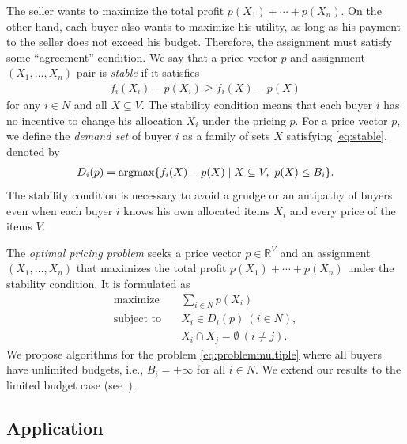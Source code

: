 \documentclass[letterpaper]{article}
\newcommand{\argmax}{\operatornamewithlimits{argmax}}
\theoremstyle{definition}
\newcommand{\COMM}[2]{{
\begin{CJK}{UTF8}{ipxm}
\ifthenelse{\equal{#1}{TM}}{\color{blue}}{
\ifthenelse{\equal{#1}{YK}}{\color{red}}{
\ifthenelse{\equal{#1}{HS}}{\color{cyan}}{
\ifthenelse{\equal{#1}{KK}}{\color{magenta}}}}}
[#1: #2]
\end{CJK}
}}
\begin{document}
The seller wants to maximize the total profit $p(X_1) + \cdots + p(X_n)$.
On the other hand, each buyer also wants to maximize his utility, as long as his payment to the seller does not exceed his budget.
Therefore, the assignment must satisfy some ``agreement'' condition.
We say that a price vector $p$ and assignment $(X_1, \ldots, X_n)$ pair is \emph{stable}
if it satisfies
\begin{align}
  \label{eq:stable}
  f_i(X_i) - p(X_i) \ge f_i(X) - p(X)
\end{align}
for any $i \in N$ and all $X \subseteq V$.
The stability condition means that each buyer $i$ has no incentive to change his allocation $X_i$ under the pricing $p$.
For a price vector $p$, we define the \emph{demand set} of buyer $i$ as a family of sets $X$ satisfying \eqref{eq:stable}, denoted by 
\begin{align}\label{eq:demandset}
  D_i(p) = \argmax \{ f_i(X) - p(X) \mid X \subseteq V, \ p(X) \leq B_i \}.
\end{align}
The stability condition is necessary to avoid a grudge or an antipathy of buyers even when each buyer $i$ knows his own allocated items $X_i$ and every price of the items $V$. 


The \emph{optimal pricing problem} %
seeks a price vector $p\in \mathbb{R}^V$ and an assignment $(X_1, \ldots, X_n)$ that maximizes the total profit $p(X_1) + \cdots + p(X_n)$ under the stability condition. 
It is formulated as
\begin{align}
    \text{maximize}&\textstyle \quad \sum_{i\in N}p(X_i)  \nonumber \\
    \text{subject to}&\quad X_i \in D_i(p) ~(i \in N), \label{eq:problemmultiple} \\
    &\quad X_i \cap X_j = \emptyset ~(i \neq j). \nonumber
\end{align}
We propose algorithms for the problem \eqref{eq:problemmultiple} where all buyers have unlimited budgets, i.e., $B_i = +\infty$ for all $i \in N$. 
We extend our results to the limited budget case (see~\cite{maehara2017optimal}). 

\subsection{Application}
\label{subsec:budgetallocation}

\end{document}
